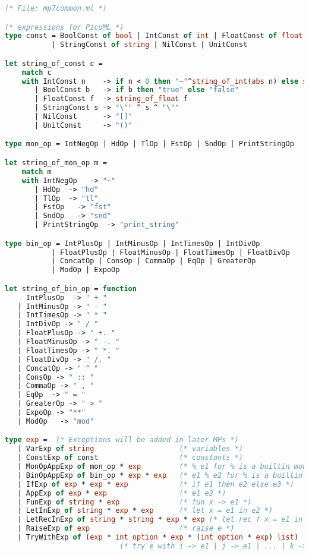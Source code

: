 \begin{lstlisting}[language=Caml, caption=definitions.ml]
(* File: mp7common.ml *)

(* expressions for PicoML *)
type const = BoolConst of bool | IntConst of int | FloatConst of float
           | StringConst of string | NilConst | UnitConst 

let string_of_const c =
    match c 
    with IntConst n    -> if n < 0 then "~"^string_of_int(abs n) else string_of_int n
       | BoolConst b   -> if b then "true" else "false"
       | FloatConst f  -> string_of_float f
       | StringConst s -> "\"" ^ s ^ "\""
       | NilConst      -> "[]"
       | UnitConst     -> "()"

type mon_op = IntNegOp | HdOp | TlOp | FstOp | SndOp | PrintStringOp

let string_of_mon_op m =
    match m
    with IntNegOp   -> "~"
       | HdOp  -> "hd"
       | TlOp  -> "tl"
       | FstOp   -> "fst"
       | SndOp   -> "snd"
       | PrintStringOp  -> "print_string"

type bin_op = IntPlusOp | IntMinusOp | IntTimesOp | IntDivOp
           | FloatPlusOp | FloatMinusOp | FloatTimesOp | FloatDivOp 
           | ConcatOp | ConsOp | CommaOp | EqOp | GreaterOp 
           | ModOp | ExpoOp

let string_of_bin_op = function 
     IntPlusOp  -> " + "
   | IntMinusOp -> " - "
   | IntTimesOp -> " * "
   | IntDivOp -> " / "
   | FloatPlusOp -> " +. "
   | FloatMinusOp -> " -. "
   | FloatTimesOp -> " *. "
   | FloatDivOp -> " /. "
   | ConcatOp -> " ^ "
   | ConsOp -> " :: "
   | CommaOp -> " , "
   | EqOp  -> " = "
   | GreaterOp -> " > "
   | ExpoOp -> "**"
   | ModOp   -> "mod"

type exp =  (* Exceptions will be added in later MPs *)
   | VarExp of string                    (* variables *)
   | ConstExp of const                   (* constants *)
   | MonOpAppExp of mon_op * exp         (* % e1 for % is a builtin monadic operator *) 
   | BinOpAppExp of bin_op * exp * exp   (* e1 % e2 for % is a builtin binary operator *)
   | IfExp of exp * exp * exp            (* if e1 then e2 else e3 *)
   | AppExp of exp * exp                 (* e1 e2 *) 
   | FunExp of string * exp              (* fun x -> e1 *)
   | LetInExp of string * exp * exp      (* let x = e1 in e2 *)
   | LetRecInExp of string * string * exp * exp (* let rec f x = e1 in e2 *)
   | RaiseExp of exp                     (* raise e *)
   | TryWithExp of (exp * int option * exp * (int option * exp) list)
		                   (* try e with i -> e1 | j -> e1 | ... | k -> en *)


\end{lstlisting}
